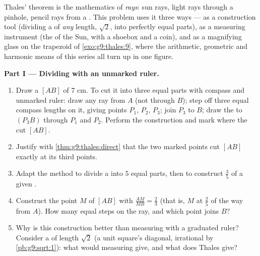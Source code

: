 \begin{problem}
\label{pb:g9:thales:1}
Thales' theorem is the mathematics of \emph{rays}: sun rays,
light rays through a pinhole, pencil rays from a . This
problem uses it three ways --- as a construction tool (dividing a
 of \emph{any} length,  $\sqrt2$, into perfectly equal
parts), as a measuring instrument (the  of the Sun, with
a shoebox and a coin), and as a magnifying glass on the trapezoid
of \cref{exo:g9:thales:9}, where the arithmetic, geometric and
harmonic means of this series all turn up in one figure.

\medskip
\noindent\textbf{Part I --- Dividing with an unmarked ruler.}
\begin{enumerate}
  \item Draw a  $[AB]$ of $7$ cm. To cut it into three
        equal parts with compass and unmarked ruler: draw any ray
        from $A$ (not through $B$); step off three equal compass
        lengths on it, giving points $P_1$, $P_2$, $P_3$; join
        $P_3$ to $B$; draw the  to $(P_3 B)$ through
        $P_1$ and $P_2$. Perform the construction and mark where
        the  cut $[AB]$.
  \item Justify with \cref{thm:g9:thales:direct} that the two
        marked points cut $[AB]$ exactly at its third points.
  \item Adapt the method to divide a  into $5$ equal
        parts, then to construct $\frac35$ of a given .
  \item Construct the point $M$ of $[AB]$ with
        $\frac{AM}{MB} = \frac23$ (that is, $M$ at $\frac25$ of
        the way from $A$). How many equal steps on the ray, and
        which point joins $B$?
  \item Why is this construction better than measuring with a
        graduated ruler? Consider a  of length $\sqrt2$
        (a unit square's diagonal, irrational by
        \cref{pb:g9:sqrt:1}): what would measuring give, and
        what does Thales give?
\end{enumerate}


\end{problem}
